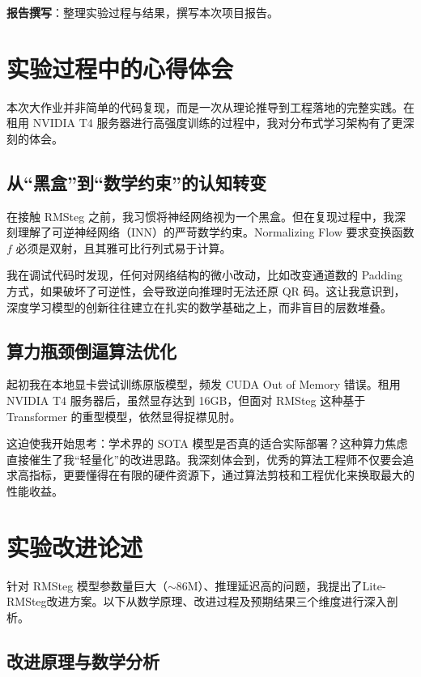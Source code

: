\documentclass[12pt]{ctexart}
\begin{document}
\textbf{报告撰写}：整理实验过程与结果，撰写本次项目报告。

\section{实验过程中的心得体会}

本次大作业并非简单的代码复现，而是一次从理论推导到工程落地的完整实践。在租用 NVIDIA T4 服务器进行高强度训练的过程中，我对分布式学习架构有了更深刻的体会。

\subsection{从“黑盒”到“数学约束”的认知转变}

在接触 RMSteg 之前，我习惯将神经网络视为一个黑盒。但在复现过程中，我深刻理解了可逆神经网络（INN）的严苛数学约束。Normalizing Flow 要求变换函数 $f$ 必须是双射，且其雅可比行列式易于计算。

我在调试代码时发现，任何对网络结构的微小改动，比如改变通道数的 Padding 方式，如果破坏了可逆性，会导致逆向推理时无法还原 QR 码。这让我意识到，深度学习模型的创新往往建立在扎实的数学基础之上，而非盲目的层数堆叠。

\subsection{算力瓶颈倒逼算法优化}

起初我在本地显卡尝试训练原版模型，频发 CUDA Out of Memory 错误。租用 NVIDIA T4 服务器后，虽然显存达到 16GB，但面对 RMSteg 这种基于 Transformer 的重型模型，依然显得捉襟见肘。

这迫使我开始思考：学术界的 SOTA 模型是否真的适合实际部署？这种算力焦虑直接催生了我“轻量化”的改进思路。我深刻体会到，优秀的算法工程师不仅要会追求高指标，更要懂得在有限的硬件资源下，通过算法剪枝和工程优化来换取最大的性能收益。

\section{实验改进论述}

针对 RMSteg 模型参数量巨大（$\sim$86M）、推理延迟高的问题，我提出了Lite-RMSteg改进方案。以下从数学原理、改进过程及预期结果三个维度进行深入剖析。

\subsection{改进原理与数学分析}
\end{document}

